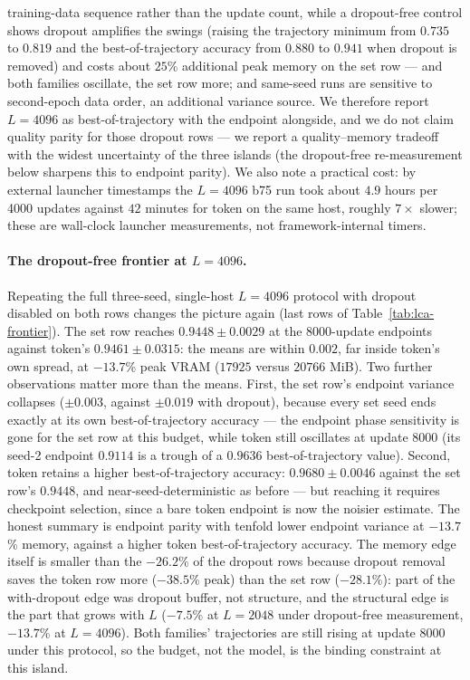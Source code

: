 \documentclass{article}
\theoremstyle{plain}
\theoremstyle{definition}
\theoremstyle{remark}
\begin{document}
training-data sequence rather than the update count, while a dropout-free
control shows dropout amplifies the swings (raising the trajectory minimum
from $0.735$ to $0.819$ and the best-of-trajectory accuracy from $0.880$ to
$0.941$ when dropout is removed) and costs
about $25$\% additional peak memory on the set row --- and both families
oscillate, the set row more; and
same-seed runs are sensitive to
second-epoch data order, an additional variance source.  We therefore
report $L=4096$ as best-of-trajectory with the endpoint alongside, and we
do not claim quality parity for those dropout rows --- we report a
quality--memory tradeoff with the widest uncertainty of the three islands
(the dropout-free re-measurement below sharpens this to endpoint parity).  We also note a
practical cost: by external launcher timestamps the $L=4096$ b75 run took
about $4.9$ hours per 4000 updates against $42$ minutes for token on the same
host, roughly $7\times$ slower; these are wall-clock launcher measurements,
not framework-internal timers.

\paragraph{The dropout-free frontier at $L=4096$.}  Repeating the full
three-seed, single-host $L=4096$ protocol with dropout disabled on both rows
changes the picture again (last rows of
Table~\ref{tab:lca-frontier}).  The set row reaches
$0.9448\pm0.0029$ at the 8000-update endpoints against token's
$0.9461\pm0.0315$: the means are within $0.002$, far inside token's own
spread, at $-13.7$\% peak VRAM ($17925$ versus $20766$ MiB).  Two further
observations matter more than the means.  First, the set row's endpoint
variance collapses ($\pm0.003$, against $\pm0.019$ with dropout), because
every set seed ends exactly at its own best-of-trajectory accuracy --- the
endpoint phase sensitivity is gone for the set row at this budget,
while token still oscillates at update 8000 (its seed-2 endpoint $0.9114$
is a trough of a $0.9636$ best-of-trajectory value).  Second, token retains a
higher best-of-trajectory accuracy: $0.9680\pm0.0046$ against the set
row's $0.9448$, and near-seed-deterministic as before --- but reaching it
requires checkpoint selection, since a bare token endpoint is now the
noisier estimate.  The honest summary is endpoint parity with tenfold
lower endpoint variance at $-13.7$\% memory, against a higher
token best-of-trajectory accuracy.  The memory edge itself is smaller than the
$-26.2$\% of the dropout rows because dropout removal saves the token row
more ($-38.5$\% peak) than the set row ($-28.1$\%): part of the with-dropout
edge was dropout buffer, not structure, and the structural edge is the part
that grows with $L$ ($-7.5$\% at $L=2048$ under dropout-free measurement,
$-13.7$\% at $L=4096$).  Both families' trajectories are still rising at
update 8000 under this protocol, so the budget, not the model, is the binding
constraint at this island.
\end{document}
